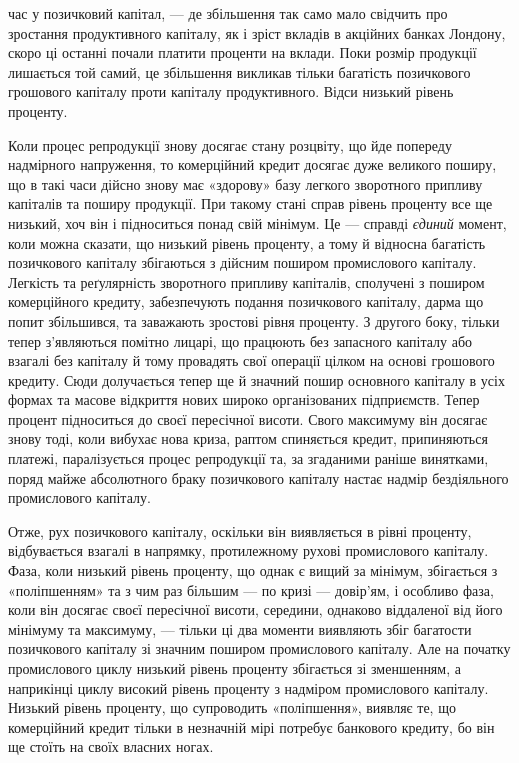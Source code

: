 \parcont{}  %
час у позичковий капітал, — де збільшення так само мало свідчить про зростання
продуктивного капіталу, як і зріст вкладів в акційних банках Лондону, скоро
ці останні почали платити проценти на вклади. Поки розмір продукції лишається
той самий, це збільшення викликав тільки багатість позичкового грошового
капіталу проти капіталу продуктивного. Відси низький рівень проценту.

Коли процес репродукції знову досягає стану розцвіту, що йде попереду надмірного
напруження, то комерційний кредит досягає дуже великого поширу, що в такі
часи дійсно знову має «здорову» базу легкого зворотного припливу капіталів та поширу
продукції. При такому стані справ рівень проценту все ще низький, хоч він і
підноситься понад свій мінімум. Це — справді \emph{єдиний} момент, коли можна сказати,
що низький рівень проценту, а тому й відносна багатість позичкового капіталу
збігаються з дійсним поширом промислового капіталу. Легкість та реґулярність
зворотного припливу капіталів, сполучені з поширом комерційного кредиту,
забезпечують подання позичкового капіталу, дарма що попит збільшився, та
заважають зростові рівня проценту. З другого боку, тільки тепер з’являються
помітно лицарі, що працюють без запасного капіталу або взагалі без капіталу
й тому провадять свої операції цілком на основі грошового кредиту. Сюди
долучається тепер ще й значний пошир основного капіталу в усіх формах та
масове відкриття нових широко організованих підприємств. Тепер процент підноситься
до своєї пересічної висоти. Свого максимуму він досягає знову тоді, коли вибухає
нова криза, раптом спиняється кредит, припиняються платежі, паралізується
процес репродукції та, за згаданими раніше винятками, поряд майже абсолютного
браку позичкового капіталу настає надмір бездіяльного промислового капіталу.

Отже, рух позичкового капіталу, оскільки він виявляється в рівні проценту,
відбувається взагалі в напрямку, протилежному рухові промислового капіталу.
Фаза, коли низький рівень проценту, що однак є вищий за мінімум, збігається
з «поліпшенням» та з чим раз більшим — по кризі — довір’ям, і особливо фаза,
коли він досягає своєї пересічної висоти, середини, однаково віддаленої від його
мінімуму та максимуму, — тільки ці два моменти виявляють збіг багатости позичкового
капіталу зі значним поширом промислового капіталу. Але на початку
промислового циклу низький рівень проценту збігається зі зменшенням, а наприкінці
циклу високий рівень проценту з надміром промислового капіталу. Низький
рівень проценту, що супроводить «поліпшення», виявляє те, що комерційний
кредит тільки в незначній мірі потребує банкового кредиту, бо він ще стоїть
на своїх власних ногах.

